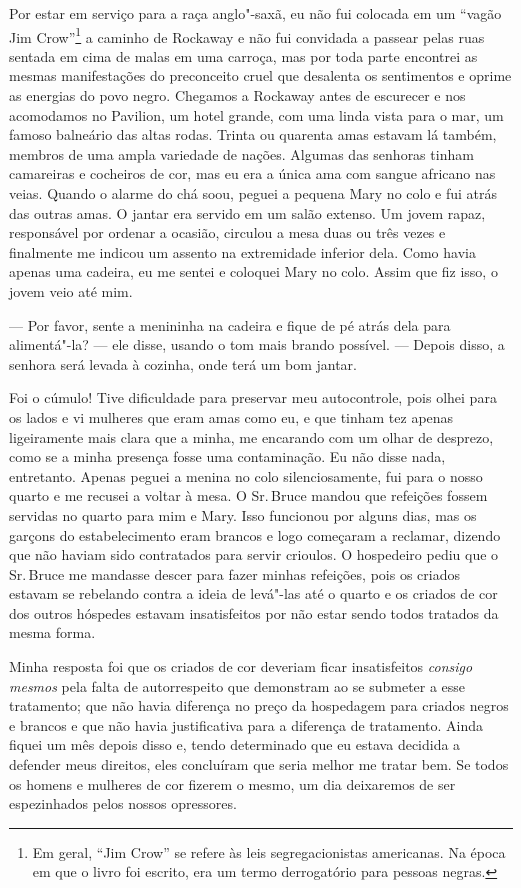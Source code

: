 Por estar em serviço para a raça
anglo"-saxã, eu não fui colocada em um ``vagão Jim Crow''\footnote{Em geral, ``Jim Crow'' se refere às leis segregacionistas
  americanas. Na época em que o livro foi escrito, era um termo
  derrogatório para pessoas negras.} a caminho de Rockaway e não fui
convidada a passear pelas ruas sentada em cima de malas em uma carroça,
mas por toda parte encontrei as mesmas manifestações do preconceito
cruel que desalenta os sentimentos e oprime as energias do povo negro.
Chegamos a Rockaway antes de escurecer e nos acomodamos no Pavilion, um
hotel grande, com uma linda vista para o mar, um famoso balneário das
altas rodas. Trinta ou quarenta amas estavam lá também, membros de uma
ampla variedade de nações. Algumas das senhoras tinham camareiras e
cocheiros de cor, mas eu era a única ama com sangue africano nas veias.
Quando o alarme do chá soou, peguei a pequena Mary no colo e fui atrás
das outras amas. O jantar era servido em um salão extenso. Um jovem
rapaz, responsável por ordenar a ocasião, circulou a mesa duas ou três
vezes e finalmente me indicou um assento na extremidade inferior dela.
Como havia apenas uma cadeira, eu me sentei e coloquei Mary no colo.
Assim que fiz isso, o jovem veio até mim.

--- Por favor, sente a menininha na cadeira e fique de pé atrás dela
para alimentá"-la? --- ele disse, usando o tom mais brando possível. ---
Depois disso, a senhora será levada à cozinha, onde terá um bom jantar.

Foi o cúmulo! Tive dificuldade para
preservar meu autocontrole, pois olhei para os lados e vi mulheres que
eram amas como eu, e que tinham tez apenas ligeiramente mais clara que a
minha, me encarando com um olhar de desprezo, como se a minha presença
fosse uma contaminação. Eu não disse nada, entretanto. Apenas peguei a
menina no colo silenciosamente, fui para o nosso quarto e me recusei a
voltar à mesa. O Sr.\,Bruce mandou que refeições fossem servidas no
quarto para mim e Mary. Isso funcionou por alguns dias, mas os garçons
do estabelecimento eram brancos e logo começaram a reclamar, dizendo que
não haviam sido contratados para servir crioulos. O hospedeiro pediu que
o Sr.\,Bruce me mandasse descer para fazer minhas refeições, pois os
criados estavam se rebelando contra a ideia de levá"-las até o quarto e
os criados de cor dos outros hóspedes estavam insatisfeitos por não
estar sendo todos tratados da mesma forma.

Minha resposta foi que os criados de
cor deveriam ficar insatisfeitos \emph{consigo mesmos} pela falta de
autorrespeito que demonstram ao se submeter a esse tratamento; que não
havia diferença no preço da hospedagem para criados negros e brancos e
que não havia justificativa para a diferença de tratamento. Ainda fiquei
um mês depois disso e, tendo determinado que eu estava decidida a
defender meus direitos, eles concluíram que seria melhor me tratar bem.
Se todos os homens e mulheres de cor fizerem o mesmo, um dia deixaremos
de ser espezinhados pelos nossos opressores.

